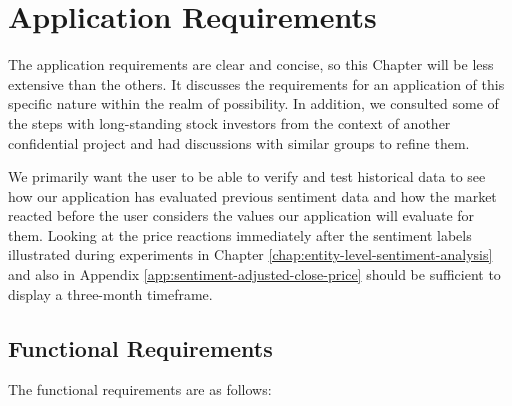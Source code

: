 \chapter{Application Requirements}
\label{chap:application-requirements}
The application requirements are clear and concise, so this Chapter will be less extensive than the others. It discusses the requirements for an application of this specific nature within the realm of possibility. In addition, we consulted some of the steps with long-standing stock investors from the context of another confidential project and had discussions with similar groups to refine them. 

We primarily want the user to be able to verify and test historical data to see how our application has evaluated previous sentiment data and how the market reacted before the user considers the values our application will evaluate for them. Looking at the price reactions immediately after the sentiment labels illustrated during experiments in Chapter \ref{chap:entity-level-sentiment-analysis} and also in Appendix \ref{app:sentiment-adjusted-close-price} should be sufficient to display a three-month timeframe.

\section{Functional Requirements}
\label{sec:functional-requirements}
The functional requirements are as follows:

